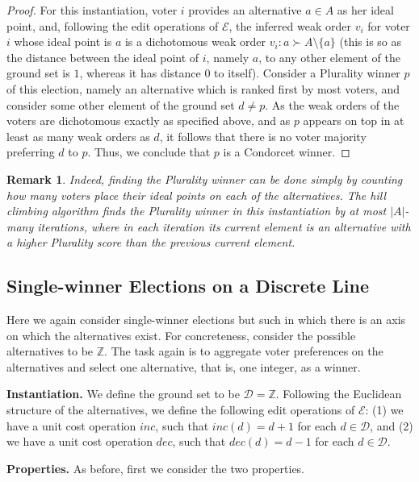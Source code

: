 \documentclass[sigconf]{aamas}  %
\newtheorem{remark}{Remark}
\newcommand{\mypara}[1]{\smallskip\noindent\textbf{#1.}}
\newcommand{\calD}{\mathcal{D}}
\newcommand{\calE}{\mathcal{E}}
\newcommand{\pref}{\succ}
\begin{document}
\begin{proof}
%
For this instantiation, voter $i$ provides an alternative $a \in A$ as her ideal point,
and, following the edit operations of $\calE$, the inferred weak order $v_i$ for voter $i$ whose ideal point is $a$ is a dichotomous weak order $v_i : a \pref A \setminus \{a\}$
(this is so as the distance between the ideal point of $i$, namely $a$, to any other element of the ground set is $1$, whereas it has distance $0$ to itself).
Consider a Plurality winner $p$ of this election,
namely an alternative which is ranked first by most voters,
and consider some other element of the ground set $d \neq p$.
As the weak orders of the voters are dichotomous exactly as specified above, and as $p$ appears on top in at least as many weak orders as $d$,
it follows that there is no voter majority preferring $d$ to $p$.
Thus, we conclude that $p$ is a Condorcet winner.
%
\end{proof}

\begin{remark}
%
Indeed, finding the Plurality winner can be done simply by counting how many voters place their ideal points on each of the alternatives.
The hill climbing algorithm finds the Plurality winner in this instantiation by at most $|A|$-many iterations,
where in each iteration its current element is an alternative with a higher Plurality score than the previous current element.
%
\end{remark}


\subsection{Single-winner Elections on a Discrete Line}

Here we again consider single-winner elections but such in which there is an axis on which the alternatives exist.
For concreteness, consider the possible alternatives to be $\mathbb{Z}$.
The task again is to aggregate voter preferences on the alternatives and select one alternative, that is, one integer, as a winner.


\mypara{Instantiation}
%
We define the ground set to be $\calD = \mathbb{Z}$.
Following the Euclidean structure of the alternatives,
we define the following edit operations of $\calE$:
  (1) we have a unit cost operation $inc$, such that $inc(d) = d + 1$ for each $d \in \calD$,
  and
  (2) we have a unit cost operation $dec$, such that $dec(d) = d - 1$ for each $d \in \calD$.


\mypara{Properties}
%
As before, first we consider the two properties.
\end{document}

